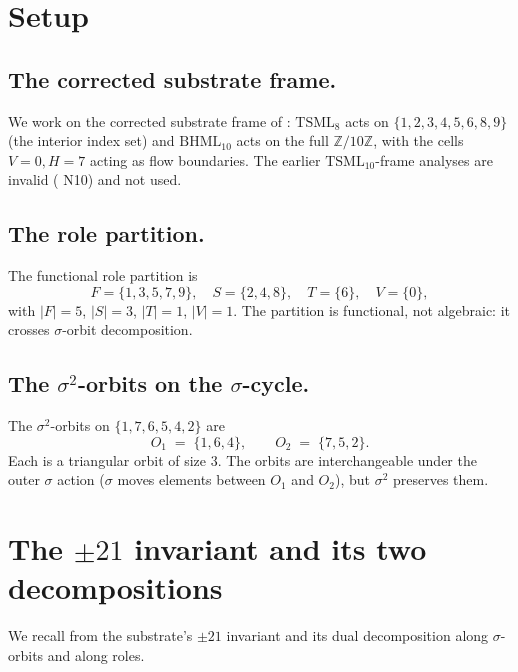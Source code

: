 \documentclass[11pt,reqno]{amsart}
\theoremstyle{plain}
\theoremstyle{definition}
\theoremstyle{remark}
\newcommand{\Z}{\mathbb{Z}}
\newcommand{\TS}{\mathrm{TSML}}
\newcommand{\BH}{\mathrm{BHML}}
\newcommand{\sig}{\sigma}
\begin{document}
\section{Setup}
\label{sec:setup}

\subsection{The corrected substrate frame.}
We work on the corrected substrate frame of
\cite{SandersGishFourCore, SandersBridgeWP9}: $\TS_{8}$ acts on
$\{1, 2, 3, 4, 5, 6, 8, 9\}$ (the interior index set) and $\BH_{10}$
acts on the full $\Z/10\Z$, with the cells
$V = 0, H = 7$ acting as flow boundaries. The earlier
$\TS_{10}$-frame analyses are invalid (\cite{SandersBridgeWP9} N10)
and not used.

\subsection{The role partition.}
The functional role partition is
\[
  F = \{1, 3, 5, 7, 9\},
  \quad S = \{2, 4, 8\},
  \quad T = \{6\},
  \quad V = \{0\},
\]
with $|F| = 5$, $|S| = 3$, $|T| = 1$, $|V| = 1$. The partition is
functional, not algebraic: it crosses $\sig$-orbit decomposition.

\subsection{The $\sig^{2}$-orbits on the $\sig$-cycle.}
The $\sig^{2}$-orbits on $\{1, 7, 6, 5, 4, 2\}$ are
\[
  O_{1} \;=\; \{1, 6, 4\},
  \qquad O_{2} \;=\; \{7, 5, 2\}.
\]
Each is a triangular orbit of size $3$. The orbits are interchangeable
under the outer $\sig$ action ($\sig$ moves elements between $O_{1}$
and $O_{2}$), but $\sig^{2}$ preserves them.

\section{The $\pm 21$ invariant and its two decompositions}
\label{sec:invariant}

We recall from \cite{SandersBridgeWP9} the substrate's $\pm 21$
invariant and its dual decomposition along $\sig$-orbits and along
roles.
\end{document}
